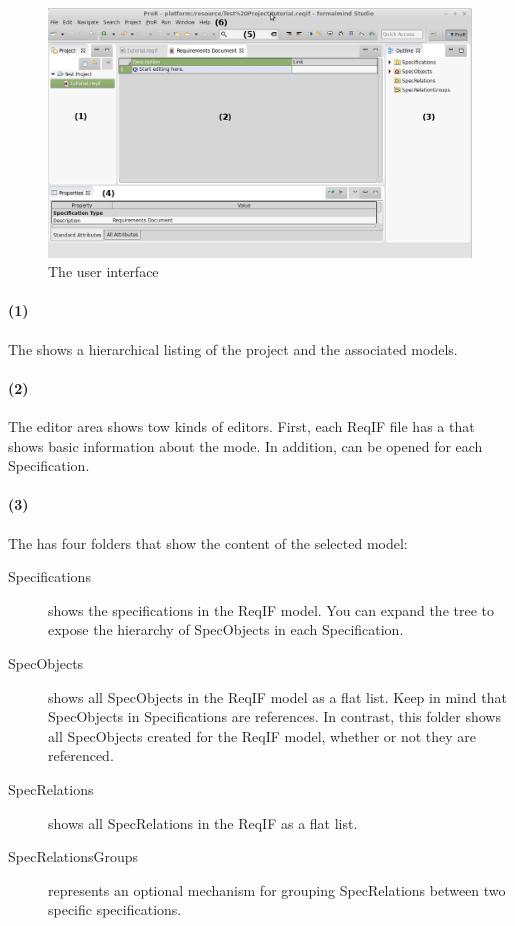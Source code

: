 \begin{figure}
  \centering
  \includegraphics[width=\linewidth]{../rmf-images/Screenshot_intro.png}
  \caption{The \pror{} user interface}
  \label{fig:user_interface_overview}
\end{figure}

\paragraph{(1)} The  shows a hierarchical listing of the project and the associated models.

\paragraph{(2)} The editor area shows tow kinds of editors.  First, each ReqIF file has a  that shows basic information about the mode.  In addition,  can be opened for each Specification.

\paragraph{(3)} The  has four folders that show the content of the selected model:

\begin{description}

\item[Specifications] shows the specifications in the ReqIF model.  You can
  expand the tree to expose the hierarchy of SpecObjects in each Specification.
\item[SpecObjects] shows all SpecObjects in the ReqIF model as a flat list.
  Keep in mind that SpecObjects in Specifications are references.  In
  contrast, this folder shows all SpecObjects created for the ReqIF model, whether or not they are referenced.
\item[SpecRelations] shows all SpecRelations in the ReqIF as a flat list.
\item[SpecRelationsGroups] represents an optional mechanism for grouping SpecRelations between two specific specifications.
\end{description}

